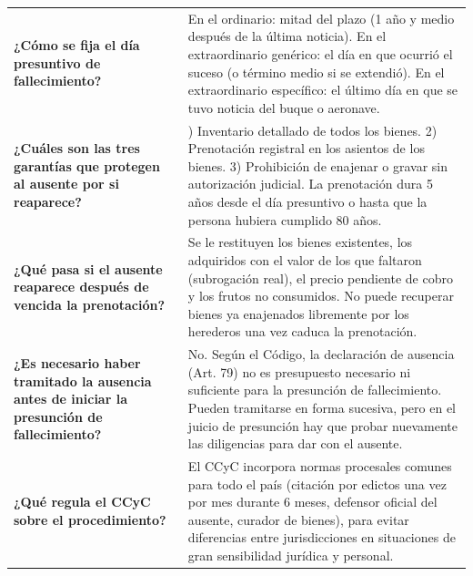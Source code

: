 \documentclass[12pt,oneside]{book}
\begin{document}
\begin{longtable}{
    >{\raggedright\arraybackslash}p{}
    >{\raggedright\arraybackslash}p{}
}
\textbf{¿Cómo se fija el día presuntivo de fallecimiento?} &
En el ordinario: mitad del plazo (1 año y medio después de la última
noticia). En el extraordinario genérico: el día en que ocurrió el suceso
(o término medio si se extendió). En el extraordinario específico: el
último día en que se tuvo noticia del buque o aeronave. \\

\textbf{¿Cuáles son las tres garantías que protegen al ausente por si
reaparece?} &
1) Inventario detallado de todos los bienes. 2) Prenotación registral en
los asientos de los bienes. 3) Prohibición de enajenar o gravar sin
autorización judicial. La prenotación dura 5 años desde el día presuntivo
o hasta que la persona hubiera cumplido 80 años. \\

\textbf{¿Qué pasa si el ausente reaparece después de vencida la
prenotación?} &
Se le restituyen los bienes existentes, los adquiridos con el valor de
los que faltaron (subrogación real), el precio pendiente de cobro y los
frutos no consumidos. No puede recuperar bienes ya enajenados libremente
por los herederos una vez caduca la prenotación. \\

\textbf{¿Es necesario haber tramitado la ausencia antes de iniciar la
presunción de fallecimiento?} &
No. Según el Código, la declaración de ausencia (Art. 79) no es
presupuesto necesario ni suficiente para la presunción de fallecimiento.
Pueden tramitarse en forma sucesiva, pero en el juicio de presunción hay
que probar nuevamente las diligencias para dar con el ausente. \\

\textbf{¿Qué regula el CCyC sobre el procedimiento?} &
El CCyC incorpora normas procesales comunes para todo el país (citación
por edictos una vez por mes durante 6 meses, defensor oficial del
ausente, curador de bienes), para evitar diferencias entre jurisdicciones
en situaciones de gran sensibilidad jurídica y personal. \\

\midrule


\end{longtable}
\end{document}
